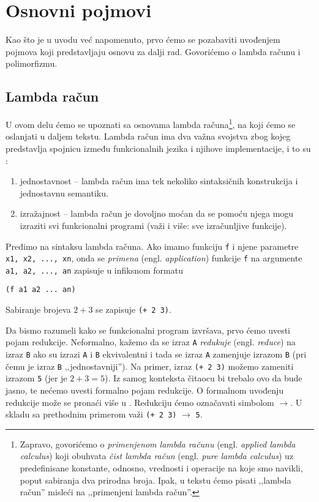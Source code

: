 \section{Osnovni pojmovi}
\label{sec:osnovni pojmovi}

Kao što je u uvodu već napomenuto, prvo ćemo se pozabaviti uvođenjem pojmova koji predstavljaju osnovu za dalji rad. Govorićemo o lambda računu i polimorfizmu.

\subsection{Lambda račun}
\label{subsec:lambda racun}


U ovom delu ćemo se upoznati sa osnovama lambda računa\footnote{Zapravo, govorićemo o \textit{primenjenom lambda računu} (engl. \textit{applied lambda calculus}) koji obuhvata \textit{čist lambda račun} (engl. \textit{pure lambda calculus}) uz predefinisane konstante, odnosno, vrednosti i operacije na koje smo navikli, poput sabiranja dva prirodna broja. Ipak, u tekstu ćemo pisati ‚‚lambda račun'' misleći na ‚‚primenjeni lambda račun''.}, na koji ćemo se oslanjati u daljem tekstu. Lambda račun ima dva važna svojstva zbog kojeg predstavlja spojnicu između funkcionalnih jezika i njihove implementacije, i to su \cite{the-implementation-of-functional-programming-languages}:
\begin{enumerate}
	\item jednostavnost -- lambda račun ima tek nekoliko sintaksičnih konstrukcija i jednostavnu semantiku.
	\item izražajnost -- lambda račun je dovoljno moćan da se pomoću njega mogu izraziti svi funkcionalni programi (važi i više: sve izračunljive funkcije).
\end{enumerate}

Pređimo na sintaksu lambda računa. Ako imamo funkciju \verb|f| i njene parametre \verb|x1, x2, ..., xn|, onda se \textit{primena} (engl. \textit{application}) funkcije \verb|f| na argumente \verb|a1, a2, ..., an| zapisuje u infiksnom formatu
\begin{center}
	\verb|(f a1 a2 ... an)|
\end{center}

\begin{primer}
	Sabiranje brojeva $2+3$ se zapisuje \verb|(+ 2 3)|.
\end{primer}

Da bismo razumeli kako se funkcionalni program izvršava, prvo ćemo uvesti pojam redukcije. Neformalno, kažemo da se izraz \verb|A| \textit{redukuje} (engl. \textit{reduce}) na izraz \verb|B| ako su izrazi \verb|A| i \verb|B| ekvivalentni i tada se izraz \verb|A| zamenjuje izrazom \verb|B| (pri čemu je izraz \verb|B| ‚‚jednostavniji''). Na primer, izraz \verb|(+ 2 3)| možemo zameniti izrazom \verb|5| (jer je $2+3=5$). Iz samog konteksta čitaocu bi trebalo ovo da bude jasno, te nećemo uvesti formalno pojam redukcije. O formalnom uvođenju redukcije može se pronaći više u \cite{foundations-of-functional-programming}. Redukciju ćemo označavati simbolom $\rightarrow$. U skladu sa prethodnim primerom važi \verb|(+ 2 3)| $\rightarrow$ \verb|5|.

